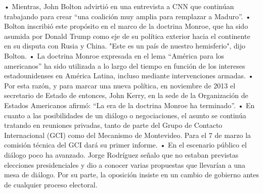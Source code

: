 \documentclass{article}%
\begin{document}
\newline%
%
•	Mientras, John Bolton advirtió en una entrevista a CNN que continúan trabajando para crear “una coalición muy amplia para remplazar a Maduro”.%
\newline%
%
•	Bolton inscribió este propósito en el marco de la doctrina Monroe, que ha sido asumida por Donald Trump como eje de su política exterior hacia el continente en su disputa con Rusia y China. "Este es un país de nuestro hemisferio", dijo Bolton.%
\newline%
%
•	La doctrina Monroe expresada en el lema “América para los americanos” ha sido utilizada a lo largo del tiempo en función de los intereses estadounidenses en América Latina, incluso mediante intervenciones armadas.%
\newline%
%
•	Por esta razón, y para marcar una nueva política, en noviembre de 2013 el secretario de Estado de entonces, John Kerry, en la sede de la Organización de Estados Americanos afirmó: “La era de la doctrina Monroe ha terminado”.%
\newline%
%
•	En cuanto a las posibilidades de un diálogo o negociaciones, el asunto se continúa tratando en reuniones privadas, tanto de parte del Grupo de Contacto Internacional (GCI) como del Mecanismo de Montevideo. Para el 7 de marzo la comisión técnica del GCI dará su primer informe.%
\newline%
%
•	En el escenario público el diálogo poco ha avanzado. Jorge Rodríguez señalo que no estaban previstas elecciones presidenciales y dio a conocer varias propuestas que llevarían a una mesa de diálogo. Por su parte, la oposición insiste en un cambio de gobierno antes de cualquier proceso electoral.%
\newline%
%
\end{document}
